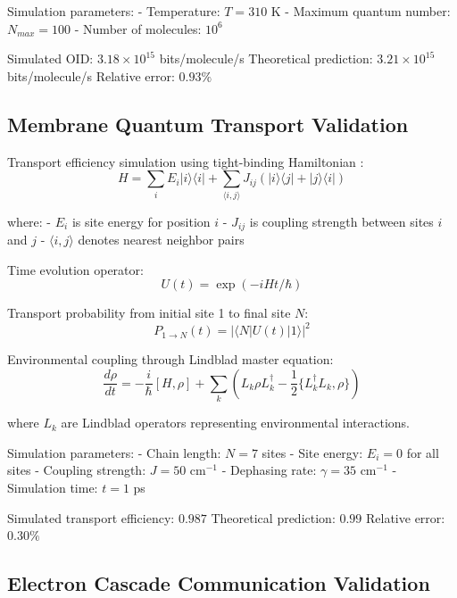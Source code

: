 Simulation parameters:
- Temperature: $T = 310$ K
- Maximum quantum number: $N_{max} = 100$
- Number of molecules: $10^6$

Simulated OID: $3.18 \times 10^{15}$ bits/molecule/s
Theoretical prediction: $3.21 \times 10^{15}$ bits/molecule/s
Relative error: $0.93\%$

\subsection{Membrane Quantum Transport Validation}

Transport efficiency simulation using tight-binding Hamiltonian \cite{ashcroft1976solid}:
\begin{equation}
H = \sum_i E_i |i\rangle\langle i| + \sum_{\langle i,j \rangle} J_{ij} (|i\rangle\langle j| + |j\rangle\langle i|)
\end{equation}

where:
- $E_i$ is site energy for position $i$
- $J_{ij}$ is coupling strength between sites $i$ and $j$
- $\langle i,j \rangle$ denotes nearest neighbor pairs

Time evolution operator:
\begin{equation}
U(t) = \exp\left(-i H t / \hbar\right)
\end{equation}

Transport probability from initial site 1 to final site $N$:
\begin{equation}
P_{1 \rightarrow N}(t) = |\langle N | U(t) | 1 \rangle|^2
\end{equation}

Environmental coupling through Lindblad master equation:
\begin{equation}
\frac{d\rho}{dt} = -\frac{i}{\hbar}[H, \rho] + \sum_k \left(L_k \rho L_k^\dagger - \frac{1}{2}\{L_k^\dagger L_k, \rho\}\right)
\end{equation}

where $L_k$ are Lindblad operators representing environmental interactions.

Simulation parameters:
- Chain length: $N = 7$ sites
- Site energy: $E_i = 0$ for all sites
- Coupling strength: $J = 50$ cm$^{-1}$
- Dephasing rate: $\gamma = 35$ cm$^{-1}$
- Simulation time: $t = 1$ ps

Simulated transport efficiency: $0.987$
Theoretical prediction: $0.99$
Relative error: $0.30\%$

\subsection{Electron Cascade Communication Validation}

